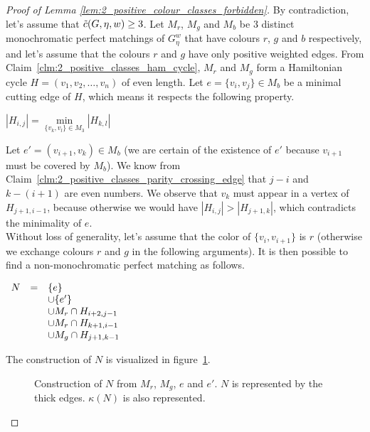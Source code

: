\begin{proof}[Proof of Lemma \ref{lem:2_positive_colour_classes_forbidden}]
    By contradiction, let's assume that $\Tilde{c}(G, \eta, w) \geq 3$.
    Let $M_r$, $M_g$ and $M_b$ be 3 distinct monochromatic perfect matchings of $G_\eta^w$ that have colours $r$, $g$ and $b$ respectively, and let's assume that the colours $r$ and $g$ have only positive weighted edges.
    From Claim~\ref{clm:2_positive_classes_ham_cycle}, $M_r$ and $M_g$ form a Hamiltonian cycle $H = (v_1, v_2, \dots, v_n)$ of even length.
    Let $e = \{v_i, v_j\} \in M_b$ be a minimal cutting edge of $H$, which means it respects the following property.
    \begin{center}
        $\left| H_{i, j} \right| = \min\limits_{\{v_k, v_l\} \in M_3} \left| H_{k, l} \right|$
    \end{center}
    Let $e' = (v_{i + 1}, v_k) \in M_b$ (we are certain of the existence of $e'$ because $v_{i+1}$ must be covered by $M_b$).
    We know from Claim~\ref{clm:2_positive_classes_parity_crossing_edge} that $j-i$ and $k - (i + 1)$ are even numbers.
    We observe that $v_k$ must appear in a vertex of $H_{j+1, i-1}$, because otherwise we would have $\left| H_{i, j} \right| > \left| H_{j+1, k} \right|$, which contradicts the minimality of $e$.\\

    Without loss of generality, let's assume that the color of $\{v_i, v_{i + 1}\}$ is $r$ (otherwise we exchange colours $r$ and $g$ in the following arguments).
    It is then possible to find a non-monochromatic perfect matching as follows.

    \begin{center}
        $\begin{array}{r c l}
             N & = & \{e\}                    \\
             &   & \cup \{e'\}                \\
             &   & \cup M_r \cap H_{i+2, j-1} \\
             &   & \cup M_r \cap H_{k+1, i-1} \\
             &   & \cup M_g \cap H_{j+1, k-1}
        \end{array}$
    \end{center}

    The construction of $N$ is visualized in figure~\ref{fig:2_pos_classes_proof}.

    \begin{figure}[H]
        \caption{Construction of $N$ from $M_r$, $M_g$, $e$ and $e'$. $N$ is represented by the thick edges.
            $\kappa(N)$ is also represented.}
        \label{fig:2_pos_classes_proof}
    \end{figure}


\end{proof}
